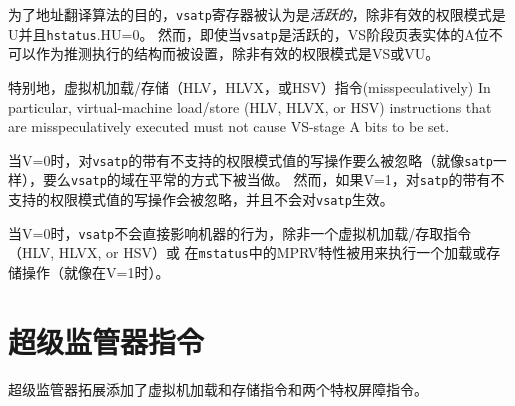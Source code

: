 为了地址翻译算法的目的，{\tt vsatp}寄存器被认为是{\em 活跃的}，除非有效的权限模式是U并且{\tt hstatus}.HU=0。
然而，即使当{\tt vsatp}是活跃的，VS阶段页表实体的A位不可以作为推测执行的结构而被设置，除非有效的权限模式是VS或VU。

\begin{commentary}
  特别地，虚拟机加载/存储（HLV，HLVX，或HSV）指令(misspeculatively)
In particular, virtual-machine load/store (HLV, HLVX, or HSV) instructions
that are misspeculatively executed must not cause VS-stage A bits to be set.
\end{commentary}

当V=0时，对{\tt vsatp}的带有不支持的权限模式值的写操作要么被忽略（就像{\tt satp}一样），要么{\tt vsatp}的域在平常的方式下被当做{\warl}。
然而，如果V=1，对{\tt satp}的带有不支持的权限模式值的写操作会被忽略，并且不会对{\tt vsatp}生效。

当V=0时，{\tt vsatp}不会直接影响机器的行为，除非一个虚拟机加载/存取指令（HLV, HLVX, or HSV）或
在{\tt mstatus}中的MPRV特性被用来执行一个加载或存储操作（就像在V=1时）。

\section{超级监管器指令}

超级监管器拓展添加了虚拟机加载和存储指令和两个特权屏障指令。

